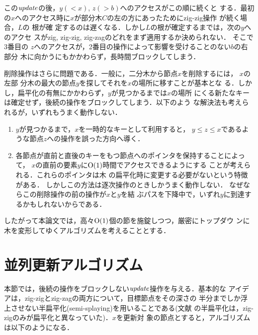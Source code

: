 \documentclass[T]{compsoft}
\begin{document}
この${\it update\/}$の後，$y(<x)$, $z(>b)$へのアクセスがこの順に続くと
する．最初の$x$へのアクセス時に$x$が部分木$C$の左の方にあったためにzig-zig操作
が続く場合，$L$の
根が確
定するのは遅くなる．しかし$L$の根が確定するまでは，次の$y$へのアクセ
スがzig, zig-zig, zig-zagのどれをまず適用するか決められない．
%
%
そこで3番目の
$z$へのアクセスが，2番目の操作によって影響を受けることのない$b$の右部分
木に向かうにもかかわらず，長時間ブロックしてしまう．

削除操作はさらに問題である．一般に，二分木から節点$x$を削除するには，
$x$の左部
分木の最大の節点$y$を探してそれを$x$の場所に移すことが基本とな
る．しかし，扁平化の有無にかかわらず，$y$が見つかるまでは$x$の場所
にくる新たなキーは確定せず，後続の操作をブロックしてしまう．以下のよう
な解決法も考えられるが，いずれもうまく動作しない．

\begin{enumerate}
\item %
$y$が見つかるまで，$x$を一時的なキーとして利用すると，
$y\le z\le x$であるような節点$z$への操作を誤った方向へ導く．

\item %
各節点が直前と直後のキーをもつ節点へのポインタを保持することによって，
$x$の直前の要素$y$に${\rm O}(1)$時間でアクセスできるようにする
ことが考えられる．これらのポインタは木
の扁平化時に変更する必要がないという特徴がある．
%
しかしこの方法は逐次操作のときしかうまく動作しない．
%
%
なぜならこの削除操作の前の操作が$x$と$y$を結
ぶパスを下降中で，いずれ$y$に到達するかもしれないからである．
\end{enumerate}

したがって本論文では，高々${\rm O}(1)$個の節を施錠しつつ，厳密にトップダウ
ンに木を変形してゆくアルゴリズムを考えることとする．

\section{並列更新アルゴリズム}\label{section:update}

本節では，後続の操作をブロックしない${\it update\/}$操作を与える．基本的な
アイデアは，zig-zigとzig-zagの両方について，目標節点をその深さの
半分までしか浮上させない半扁平化(semi-splaying)を用いることである(文献
\cite{ST85}の半扁平化は，zig-zigのみが扁平化と異なっていた)．$x$を更新対
象の節点とすると，アルゴリズムは以下のようになる．
%
\end{document}
